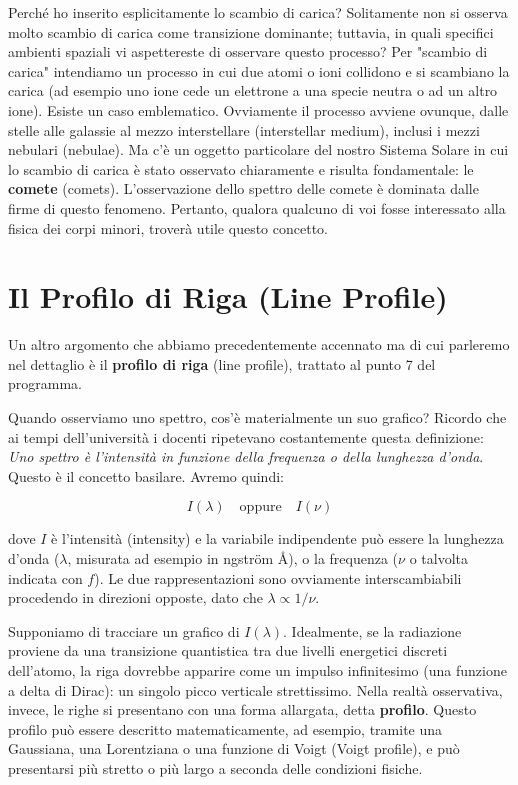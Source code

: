 Perché ho inserito esplicitamente lo scambio di carica? Solitamente non si osserva molto scambio di carica come transizione dominante; tuttavia, in quali specifici ambienti spaziali vi aspettereste di osservare questo processo?
Per "scambio di carica" intendiamo un processo in cui due atomi o ioni collidono e si scambiano la carica (ad esempio uno ione cede un elettrone a una specie neutra o ad un altro ione). Esiste un caso emblematico. Ovviamente il processo avviene ovunque, dalle stelle alle galassie al mezzo interstellare (interstellar medium), inclusi i mezzi nebulari (nebulae). Ma c'è un oggetto particolare del nostro Sistema Solare in cui lo scambio di carica è stato osservato chiaramente e risulta fondamentale: le \textbf{comete} (comets). L'osservazione dello spettro delle comete è dominata dalle firme di questo fenomeno. Pertanto, qualora qualcuno di voi fosse interessato alla fisica dei corpi minori, troverà utile questo concetto.

\section{Il Profilo di Riga (Line Profile)}

Un altro argomento che abbiamo precedentemente accennato ma di cui parleremo nel dettaglio è il \textbf{profilo di riga} (line profile), trattato al punto 7 del programma.

Quando osserviamo uno spettro, cos'è materialmente un suo grafico?
Ricordo che ai tempi dell'università i docenti ripetevano costantemente questa definizione: \textit{Uno spettro è l'intensità in funzione della frequenza o della lunghezza d'onda}.
Questo è il concetto basilare. Avremo quindi:

\begin{equation}
I(\lambda) \quad \text{oppure} \quad I(\nu)
\end{equation}

dove $I$ è l'intensità (intensity) e la variabile indipendente può essere la lunghezza d'onda ($\lambda$, misurata ad esempio in \text{\AA}ngström $\text{\AA}$), o la frequenza ($\nu$ o talvolta indicata con $f$). Le due rappresentazioni sono ovviamente interscambiabili procedendo in direzioni opposte, dato che $\lambda \propto 1/\nu$.

Supponiamo di tracciare un grafico di $I(\lambda)$. Idealmente, se la radiazione proviene da una transizione quantistica tra due livelli energetici discreti dell'atomo, la riga dovrebbe apparire come un impulso infinitesimo (una funzione a delta di Dirac): un singolo picco verticale strettissimo.
Nella realtà osservativa, invece, le righe si presentano con una forma allargata, detta \textbf{profilo}. Questo profilo può essere descritto matematicamente, ad esempio, tramite una Gaussiana, una Lorentziana o una funzione di Voigt (Voigt profile), e può presentarsi più stretto o più largo a seconda delle condizioni fisiche.

